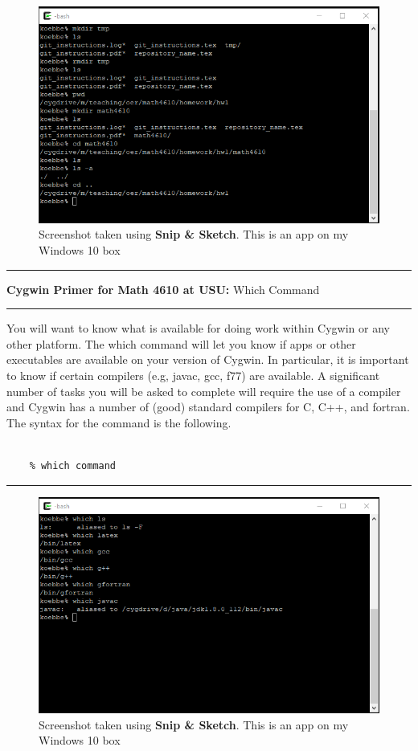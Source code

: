 \documentclass[10pt,fleqn]{article}
\begin{document}
\begin{figure}[h]
\centering
\includegraphics{./images/cygwin_03.png}
\caption{{Screenshot} taken using {\bf Snip \& Sketch}. This is an app on
         my Windows 10 box}
\end{figure}
\eject
\vskip0.1in\hrule\vskip0.1in
\noindent
{{\bf Cygwin Primer for Math 4610 at USU:} Which Command} 
\vskip0.1in\hrule\vskip0.1in
\noindent
You will want to know what is available for doing work within Cygwin or any
other platform. The which command will let you know if apps or other executables
are available on your version of Cygwin. In particular, it is important to know
if certain compilers (e.g, javac, gcc, f77) are available. A significant number
of tasks you will be asked to complete will require the use of a compiler and
Cygwin has a number of (good) standard compilers for C, C++, and fortran. The
syntax for the command is the following.
\begin{verbatim}

    % which command

\end{verbatim}
\vskip0.1in\hrule\vskip0.1in
\vfill
\begin{figure}[h]
\centering
\includegraphics{./images/cygwin_04.png}
\caption{{Screenshot} taken using {\bf Snip \& Sketch}. This is an app on
         my Windows 10 box}
\end{figure}
\end{document}
